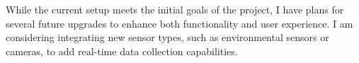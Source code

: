 While the current setup meets the initial goals of the project, I have plans for several future upgrades to enhance both functionality and user experience. I am considering integrating new sensor types, such as environmental sensors or cameras, to add real-time data collection capabilities. 